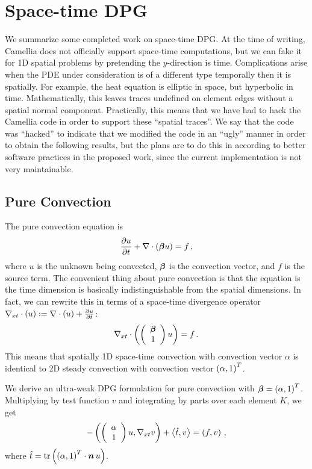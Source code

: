 \documentclass[Proposal.tex]{subfiles}
\begin{document}
\chapter{Space-time DPG}
We summarize some completed work on space-time DPG. At the time of writing, Camellia does not officially support space-time computations, but we can fake it for 1D spatial problems by pretending the $y$-direction is time.
Complications arise when the PDE under consideration is of a different type temporally then it is spatially. 
For example, the heat equation is elliptic in space, but hyperbolic in time. 
Mathematically, this leaves traces undefined on element edges without a spatial normal component. 
Practically, this means that we have had to hack the Camellia code in order to support these ``spatial traces''.
We say that the code was ``hacked'' to indicate that we modified the code in an ``ugly'' manner in order to obtain the following results, 
but the plans are to do this in according to better software practices in the proposed work, since the current implementation is not very maintainable.

\section{Pure Convection}
The pure convection equation is 
\begin{equation}
\frac{\partial u}{\partial t}+\nabla\cdot(\boldsymbol\beta u)=f\,,
\end{equation}
where $u$ is the unknown being convected, $\boldsymbol\beta$ is the convection vector, and $f$ is the source term.
The convenient thing about pure convection is that the equation is the time dimension is basically indistinguishable from the spatial dimensions. 
In fact, we can rewrite this in terms of a space-time divergence operator $\nabla_{xt}\cdot(u):=\nabla\cdot(u)+\frac{\partial u}{\partial t}$:
\[
\nabla_{xt}\cdot\left( \left( \begin{array}{c} \boldsymbol\beta\\ 1\\ \end{array} \right)u \right)=f\,.
\]
This means that spatially 1D space-time convection with convection vector $\alpha$ is identical to 2D steady convection with convection vector $\left( \alpha,1 \right)^T$.

We derive an ultra-weak DPG formulation for pure convection with $\boldsymbol\beta=\left( \alpha,1 \right)^T$. 
Multiplying by test function $v$ and integrating by parts over each element $K$, we get
\begin{equation}
-\left( \left( \begin{array}{c} \alpha\\ 1\\ \end{array} \right)u,\nabla_{xt} v \right)+\left\langle \hat t, v \right\rangle=\left( f,v \right)\,,
\end{equation}
where $\hat t=\operatorname*{tr}\left( \left( \alpha,1 \right)^T\cdot\boldsymbol n\,u \right)$.
\end{document}
